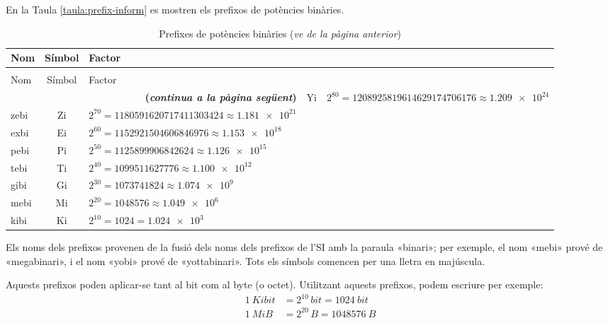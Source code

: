 En la Taula \vref{taula:prefix-inform} es mostren els prefixos de potències binàries.
\begin{longtable}[h]{lcl}
   \caption{\label{taula:prefix-inform} Prefixos de potències binàries}\\
   \toprule[1pt]
    Nom & Símbol  & Factor \\
   \midrule
   \endfirsthead
   \caption[]{Prefixes de potències binàries (\emph{ve de la pàgina anterior})}\\
   \toprule[1pt]
    Nom & Símbol  & Factor \\
   \midrule
   \endhead
   \midrule
   \multicolumn{3}{r}{\sffamily\bfseries\color{NavyBlue}(\emph{continua a la pàgina següent})}
   \endfoot
   \endlastfoot
   yobi & Yi   & $2^{80} = \num{1208925819614629174706176}\approx \num{1,209e24}$ \\
   zebi & Zi   & $2^{70} = \num{1180591620717411303424}\approx \num{1,181e21}$ \\
   exbi & Ei   & $2^{60} = \num{1152921504606846976}\approx \num{1,153e18}$ \\
   pebi & Pi   & $2^{50} = \num{1125899906842624}\approx \num{1,126e15}$ \\
   tebi & Ti   & $2^{40} = \num{1099511627776}\approx \num{1,100e12}$ \\
   gibi & Gi   & $2^{30} = \num{1073741824}\approx \num{1,074e9}$  \\
   mebi & Mi   & $2^{20} = \num{1048576} \approx \num{1,049e6}$ \\
   kibi & Ki   & $2^{10} = 1024 =\num{1,024e3}$  \\
   \bottomrule[1pt]
\end{longtable}
        
   

Els noms dels prefixos provenen de la fusió dels noms dels prefixos de l'SI amb la paraula «binari»; per exemple, el nom «mebi» prové de «megabinari», i el nom «yobi» prové de «yottabinari». Tots els símbols comencen per una lletra en majúscula. 

Aquests prefixos poden aplicar-se tant al bit com al byte (o octet). Utilitzant aquests prefixos, podem escriure per exemple:
\begin{align*}
	\qty{1}{Kibit} &= 2^{10}\unit{\,bit} = \qty{1024}{bit} \\
	\qty{1}{MiB} &= 2^{20}\unit{\,B} = \qty{1048576}{B}
\end{align*}


